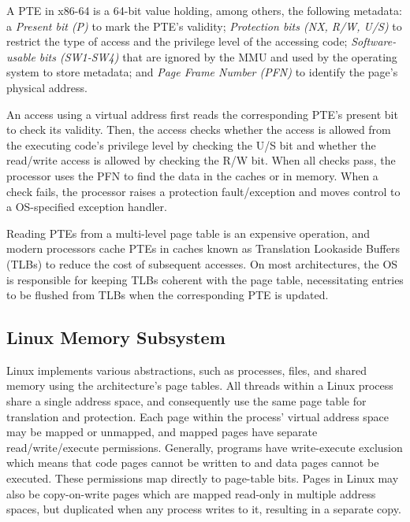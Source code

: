 \documentclass[letterpaper,twocolumn,10pt]{article}
\begin{document}
A PTE in x86-64 is a 64-bit value holding, among others, the following metadata:
a \emph{Present bit (P)} to mark the PTE's validity;
\emph{Protection bits (NX, R/W, U/S)} to restrict the type of
access and the privilege level of the accessing code;
\emph{Software-usable bits (SW1-SW4)} that are ignored by the MMU and used by the 
operating system to store metadata; and
\emph{Page Frame Number (PFN)} to identify the page's physical address.

An access using a virtual address first reads the corresponding PTE's 
present bit to check its validity. 
Then, the access checks whether the access is allowed from the executing
code's privilege level by checking the U/S bit and whether the 
read/write access is allowed by checking the R/W bit.
When all checks pass, the processor uses the PFN to find the data in 
the caches or in memory.
When a check fails, the processor raises a protection fault/exception and
moves control to a OS-specified exception handler.

Reading PTEs from a multi-level page table is an expensive operation, and 
modern processors cache PTEs in caches known as Translation Lookaside 
Buffers (TLBs) to reduce the cost of subsequent accesses. 
On most architectures, the OS is responsible for keeping TLBs coherent with 
the page table, necessitating entries to be flushed from TLBs when the 
corresponding PTE is updated.


\subsection{Linux Memory Subsystem}

Linux implements various abstractions, such as processes, files, and shared
memory using the architecture's page tables.
All threads within a Linux process share a single address space, and 
consequently use the same page table for translation and protection.
Each page within the process' virtual address space may be mapped or 
unmapped, and mapped pages have separate read/write/execute permissions.
Generally, programs have write-execute exclusion which means that 
code pages cannot be written to and data pages cannot be executed.
These permissions map directly to page-table bits.
Pages in Linux may also be copy-on-write pages which are mapped read-only
in multiple address spaces, but duplicated when any process writes
to it, resulting in a separate copy.
\end{document}
